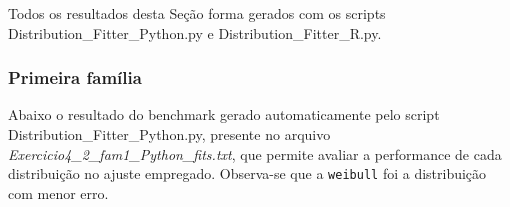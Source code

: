 Todos os resultados desta Seção forma gerados com os scripts Distribution\_Fitter\_Python.py e Distribution\_Fitter\_R.py.


\subsubsection*{Primeira família}

\begin{figure}[ht!]
	\vspace{0mm}	%
	\begin{center}
	\end{center}
	\vspace{-2mm}	%
	\label{ex4_fig8}
\end{figure}

Abaixo o resultado do benchmark gerado automaticamente pelo script Distribution\_Fitter\_Python.py, presente no arquivo \textit{Exercicio4\_2\_fam1\_Python\_fits.txt}, que permite avaliar a performance de cada distribuição no ajuste empregado. Observa-se que a \texttt{weibull} foi a distribuição com menor erro.

